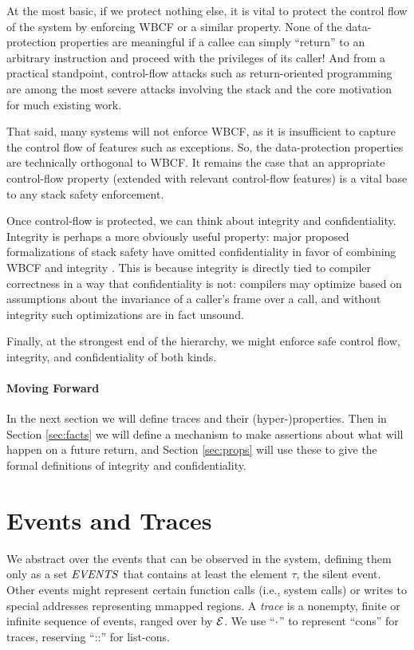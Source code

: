 \documentclass[10pt,conference]{ieeetran}%
\theoremstyle{definition}
\begin{document}
At the most basic, if we protect nothing else, it is vital to protect the control flow of the
system by enforcing WBCF or a similar property. None of the data-protection properties are
meaningful if a callee can simply ``return'' to an arbitrary instruction and proceed with
the privileges of its caller! And from a practical standpoint, control-flow attacks such
as return-oriented programming are among the most severe attacks involving the stack and
the core motivation for much existing work.

That said, many systems will not enforce WBCF, as it is insufficient to capture the
control flow of features such as exceptions. So, the data-protection properties are
technically orthogonal to WBCF. It remains the case that an appropriate control-flow
property (extended with relevant control-flow features) is a vital base to any stack safety
enforcement.

Once control-flow is protected, we can think about integrity and confidentiality.
Integrity is perhaps a more obviously useful property: major proposed formalizations
of stack safety have omitted confidentiality in favor of combining WBCF and integrity
\cite{SkorstengaardSTKJFP}. This is because integrity is directly tied to compiler correctness
in a way that confidentiality is not: compilers may optimize based on assumptions
about the invariance of a caller's frame over a call, and without integrity such optimizations
are in fact unsound.

Finally, at the strongest end of the hierarchy, we might enforce safe control flow,
integrity, and confidentiality of both kinds.

\paragraph*{Moving Forward}

In the next section we will define traces and their (hyper-)properties.
Then in Section \ref{sec:facts} we will define a mechanism to make assertions
about what will happen on a future return, and Section \ref{sec:props} will use these
to give the formal definitions of integrity and confidentiality.

\section{Events and Traces}
\label{sec:events}

We abstract over the events that can be observed in the system, defining them
only as a set \(\mathit{EVENTS}\) that contains at least the element \(\tau\), the silent
event. Other events might represent certain function calls (i.e., system calls)
or writes to special addresses representing mmapped regions.
A {\em trace} is a nonempty, finite or infinite sequence
of events, ranged over by \(\mathcal{E}\).
We use ``\(\cdot\)'' to represent ``cons'' for traces, reserving ``::''
for list-cons.
\end{document}
